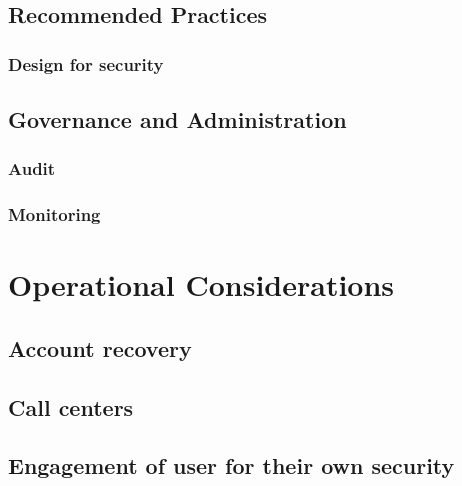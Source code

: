 \hypertarget{recommended-practices}{%
\section{Recommended Practices}\label{recommended-practices}}

\hypertarget{design-for-security}{%
\subsection{Design for security}\label{design-for-security}}

\hypertarget{governance-and-administration}{%
\section{Governance and
Administration}\label{governance-and-administration}}

\hypertarget{audit}{%
\subsection{Audit}\label{audit}}

\hypertarget{monitoring}{%
\subsection{Monitoring}\label{monitoring}}

\hypertarget{operational-considerations}{%
\chapter{Operational Considerations}\label{operational-considerations}}

\hypertarget{account-recovery}{%
\section{Account recovery}\label{account-recovery}}

\hypertarget{call-centers}{%
\section{Call centers}\label{call-centers}}

\hypertarget{engagement-of-user-for-their-own-security}{%
\section{Engagement of user for their own
security}\label{engagement-of-user-for-their-own-security}}

